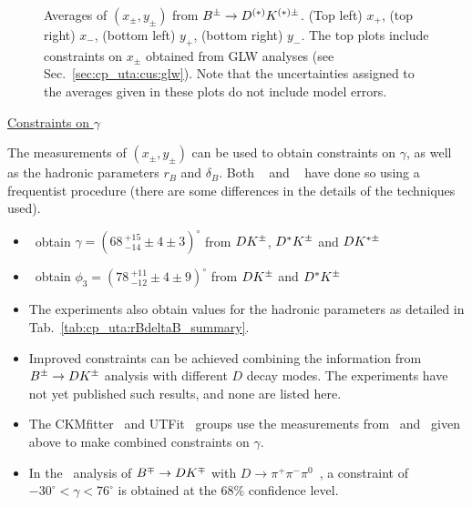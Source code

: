 \begin{figure}[htb]
\begin{center}
{    }
  \end{center}
  \vspace{-0.8cm}
  \caption{
    Averages of $(x_\pm, y_\pm)$ from $B^\pm \to D^{(*)}K^{(*)\pm}$.
    (Top left) $x_+$, (top right) $x_-$,
    (bottom left) $y_+$, (bottom right) $y_-$.
    The top plots include constraints on $x_{\pm}$ obtained from GLW analyses (see Sec.~\ref{sec:cp_uta:cus:glw}).
    Note that the uncertainties assigned to the averages given in these plots
    do not include model errors.        
  }
  \label{fig:cp_uta:cus:dalitz_1d}
\end{figure}

\vspace{3ex}

\noindent
\underline{\large Constraints on $\gamma$}

The measurements of $(x_\pm, y_\pm)$ can be used to obtain constraints on 
$\gamma$, as well as the hadronic parameters $r_B$ and $\delta_B$.
Both
\babar~\cite{delAmoSanchez:2010rq} and 
\belle~\cite{Poluektov:2010wz,Poluektov:2006ia} 
have done so using a frequentist procedure 
(there are some differences in the details of the techniques used).

\begin{itemize}\setlength{\itemsep}{0.5ex}

\item 
  \babar\ obtain $\gamma = (68 \,^{+15}_{-14} \pm 4 \pm 3)^\circ$
  from $DK^\pm$, $D^*K^\pm$ and $DK^{*\pm}$

\item
  \belle\ obtain $\phi_3 = (78 \,^{+11}_{-12} \pm 4 \pm 9)^\circ$
  from $DK^\pm$ and $D^*K^\pm$

\item
  The experiments also obtain values for the hadronic parameters as detailed
  in Tab.~\ref{tab:cp_uta:rBdeltaB_summary}.

\item 
  Improved constraints can be achieved combining the information from
  $B^\pm \to DK^\pm$ analysis with different $D$ decay modes.
  The experiments have not yet published such results,
  and none are listed here.

\item 
  The CKMfitter~\cite{Charles:2004jd} and 
  UTFit~\cite{Bona:2005vz} groups use the measurements 
  from \belle\ and \babar\ given above
  to make combined constraints on $\gamma$.

\item 
  In the \babar\ analysis of $B^\mp \to DK^\mp$ with 
  $D \to \pi^+\pi^-\pi^0$~\cite{Aubert:2007ii},
  a constraint of $-30^\circ < \gamma < 76^\circ$ is obtained 
  at the 68\% confidence level.

\end{itemize}

